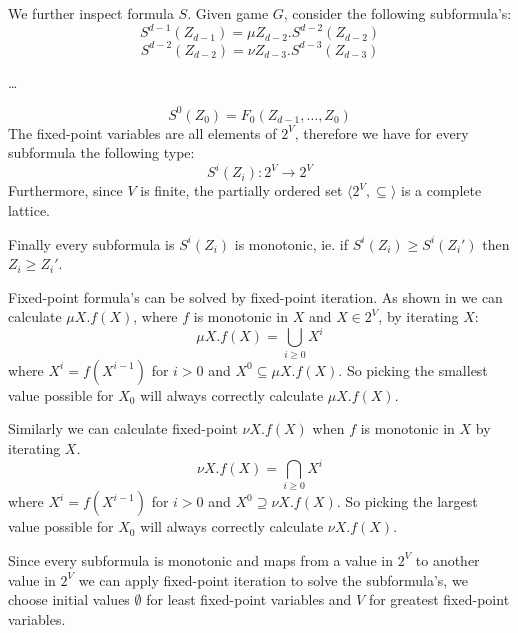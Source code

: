 We further inspect formula $S$. Given game $G$, consider the following subformula's:
\[ S^{d-1}(Z_{d-1}) = \mu Z_{d-2}.S^{d-2}(Z_{d-2})\]
\[ S^{d-2}(Z_{d-2}) = \nu Z_{d-3}.S^{d-3}(Z_{d-3})\]
\begin{center}
	\dots
\end{center}
\[ S^{0}(Z_0) = F_0(Z_{d-1},\dots,Z_0)\]
The fixed-point variables are all elements of $2^V$, therefore we have for every subformula the following type:
\[ S^i(Z_i) : 2^V \rightarrow 2^V \]
Furthermore, since $V$ is finite, the partially ordered set $\langle 2^V, \subseteq \rangle$ is a complete lattice.

Finally every subformula is $S^i(Z_i)$ is monotonic, ie. if $S^i(Z_i) \geq S^i(Z_i')$ then $Z_i \geq Z_i'$.

Fixed-point formula's can be solved by fixed-point iteration. As shown in \cite{Emerson:1986:MCP:900378} we can calculate $\mu X.f(X)$, where $f$ is monotonic in $X$ and $X \in 2^V$, by iterating $X$:
\[ \mu X.f(X) = \bigcup_{i \geq 0} X^i \]
where $X^i = f(X^{i-1})$ for $i > 0$ and $X^0 \subseteq \mu X.f(X)$. So picking the smallest value possible for $X_0$ will always correctly calculate $\mu X. f(X)$.

Similarly we can calculate fixed-point $\nu X.f(X)$ when $f$ is monotonic in $X$ by iterating $X$.
\[ \nu X.f(X) = \bigcap_{i \geq 0} X^i \]
where $X^i = f(X^{i-1})$ for $i > 0$ and $X^0 \supseteq \nu X.f(X)$. So picking the largest value possible for $X_0$ will always correctly calculate $\nu X. f(X)$.

Since every subformula is monotonic and maps from a value in $2^V$ to another value in $2^V$ we can apply fixed-point iteration to solve the subformula's, we choose initial values $\emptyset$ for least fixed-point variables and $V$ for greatest fixed-point variables.

